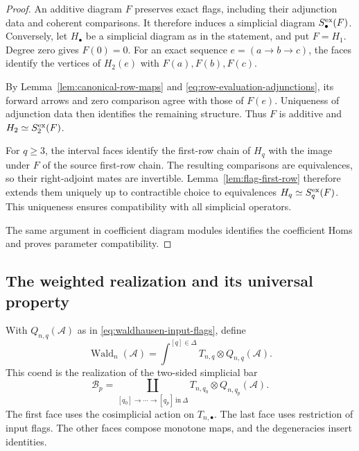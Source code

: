 \begin{proof}
An additive diagram $F$ preserves exact flags,
including their adjunction data and coherent
comparisons. It therefore induces a simplicial
diagram $S_\bullet^{\mathrm{ex}}(F)$.
Conversely, let $H_\bullet$ be a simplicial
diagram as in the statement, and put $F=H_1$.
Degree zero gives $F(0)=0$.
For an exact sequence $e=(a\to b\to c)$,
the faces identify the vertices of $H_2(e)$
with $F(a),F(b),F(c)$.

By Lemma~\ref{lem:canonical-row-maps}
and \eqref{eq:row-evaluation-adjunctions},
its forward arrows and zero comparison
agree with those of $F(e)$.
Uniqueness of adjunction data
then identifies the remaining structure.
Thus $F$ is additive and
$H_2\simeq S_2^{\mathrm{ex}}(F)$.

For $q\geq3$, the interval faces identify
the first-row chain of $H_q$ with the image
under $F$ of the source first-row chain.
The resulting comparisons are equivalences,
so their right-adjoint mates are invertible.
Lemma~\ref{lem:flag-first-row} therefore
extends them uniquely up to contractible choice
to equivalences $H_q\simeq S_q^{\mathrm{ex}}(F)$.
This uniqueness ensures compatibility with
all simplicial operators.

The same argument in coefficient diagram modules
identifies the coefficient Homs and proves
parameter compatibility.
\end{proof}


\subsection{The weighted realization and its universal property}

\begin{definition}\label{def:weighted-s-construction}
With $Q_{n,q}(\mathcal A)$ as in \eqref{eq:waldhausen-input-flags}, define
\begin{equation}\label{eq:weighted-s-construction}
 \operatorname{Wald}_n(\mathcal A)
       =\int^{[q]\in\Delta}T_{n,q}\otimes Q_{n,q}(\mathcal A).
\end{equation}
This coend is the realization of the two-sided simplicial bar
\begin{equation}\label{eq:weighted-s-bar}
 \mathcal B_p=
 \coprod_{[q_0]\to\cdots\to[q_p]\ \mathrm{in}\ \Delta}
       T_{n,q_0}\otimes Q_{n,q_p}(\mathcal A).
\end{equation}
The first face uses the cosimplicial action on $T_{n,\bullet}$.
The last face uses restriction of input flags. The other faces
compose monotone maps, and the degeneracies insert identities.
\end{definition}

